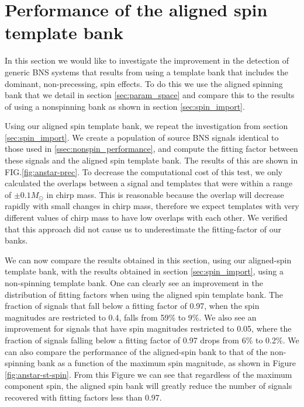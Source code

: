 \section{Performance of the aligned spin template bank}
\label{sec:aligned_spin_performance}

In this section we would like to investigate the improvement in the 
detection of generic BNS systems that results from using a template bank
that includes the dominant, non-precessing, spin effects. To do this we use the aligned spinning bank that
we detail in section \ref{sec:param_space} and compare this to the results of using a nonspinning bank 
as shown in section \ref{sec:spin_import}. 

Using our aligned spin template bank, we repeat the investigation from section \ref{sec:spin_import}. We create a 
population of source BNS signals identical to those used in \ref{ssec:nonspin_performance}, and compute the fitting factor
between these signals and the aligned spin template bank. The results of this are shown in FIG.\ref{fig:anstar-prec}.
To decrease the computational cost of this test, we only calculated the overlaps between a signal and templates that
were within a range of $\pm0.1M_{\odot}$ in chirp mass. This is reasonable because the overlap will decrease rapidly
with small changes in chirp mass,
therefore we expect templates with very different values of chirp mass to have low overlaps with each other. We verified
that this approach did not cause us to underestimate the fitting-factor of our banks.

We can now compare the results obtained in this section, using our aligned-spin template bank, with the results obtained in section
\ref{sec:spin_import}, using a non-spinning template bank. One can clearly see an 
improvement in the distribution of fitting factors when using the aligned spin template bank. The fraction
of signals that fall below a fitting factor of 0.97, when the spin magnitudes are restricted to 0.4, falls from 59\% to 9\%.
We also see an  improvement for signals that have spin magnitudes restricted to 0.05, where the fraction of signals falling below a
fitting factor of 0.97 drops from 6\% to 0.2\%. We can also compare the performance of the aligned-spin bank to that of the
non-spinning bank as a function of the maximum spin magnitude,
as shown in Figure \ref{fig:anstar-st-spin}. From this Figure we can see that regardless of the maximum component
spin, the aligned spin bank will greatly reduce the number of signals recovered with fitting factors less than 0.97.

